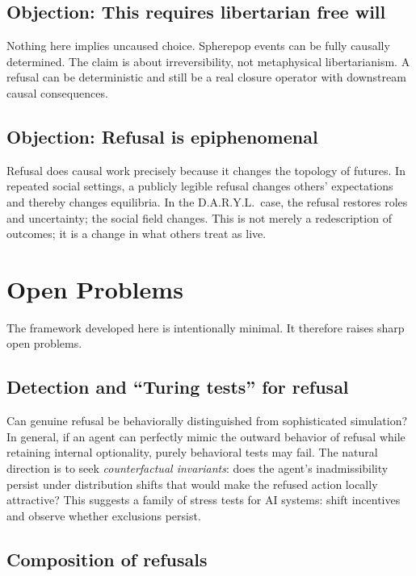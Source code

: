 \documentclass[11pt]{article}
\begin{document}
\subsection{Objection: This requires libertarian free will}

Nothing here implies uncaused choice. Spherepop events can be fully causally
determined. The claim is about irreversibility, not metaphysical libertarianism.
A refusal can be deterministic and still be a real closure operator with
downstream causal consequences.

\subsection{Objection: Refusal is epiphenomenal}

Refusal does causal work precisely because it changes the topology of futures.
In repeated social settings, a publicly legible refusal changes others'
expectations and thereby changes equilibria. In the D.A.R.Y.L.\ case, the
refusal restores roles and uncertainty; the social field changes. This is not
merely a redescription of outcomes; it is a change in what others treat as live.

\section{Open Problems}
\label{sec:open}

The framework developed here is intentionally minimal. It therefore raises sharp
open problems.

\subsection{Detection and ``Turing tests'' for refusal}

Can genuine refusal be behaviorally distinguished from sophisticated simulation?
In general, if an agent can perfectly mimic the outward behavior of refusal
while retaining internal optionality, purely behavioral tests may fail. The
natural direction is to seek \emph{counterfactual invariants}: does the agent's
inadmissibility persist under distribution shifts that would make the refused
action locally attractive? This suggests a family of stress tests for AI
systems: shift incentives and observe whether exclusions persist.

\subsection{Composition of refusals}
\end{document}
